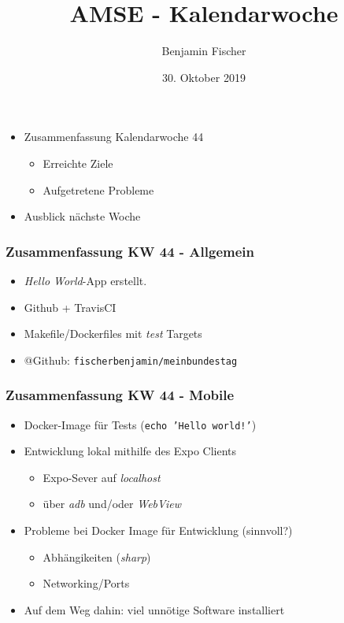 \documentclass{beamer}
\title{AMSE - Kalendarwoche \cw{}}
\date{30. Oktober 2019}
\author{Benjamin Fischer}
\institute{benjamin.f.fischer@fau.de}
\newcommand{\cw}{44}
\begin{document}
  \maketitle

  \begin{frame}
    \begin{itemize}
      \item Zusammenfassung Kalendarwoche \cw{}
      \begin{itemize}
        \item Erreichte Ziele
        \item Aufgetretene Probleme
      \end{itemize}
      \item Ausblick nächste Woche
    \end{itemize}
  \end{frame}

  \begin{frame}
    \frametitle{Zusammenfassung KW \cw{} - Allgemein}
    \begin{itemize}
      \item \textit{Hello World}-App erstellt.
      \item Github + TravisCI
      \item Makefile/Dockerfiles mit \textit{test} Targets
      \item @Github: \texttt{fischerbenjamin/meinbundestag}
    \end{itemize}
  \end{frame}
  
  \begin{frame}
    \frametitle{Zusammenfassung KW \cw{} - Mobile}
    \begin{itemize}
      \item Docker-Image für Tests (\texttt{echo 'Hello world!'})
      \item Entwicklung lokal mithilfe des Expo Clients
      \begin{itemize}
        \item Expo-Sever auf \textit{localhost}
        \item über \textit{adb} und/oder \textit{WebView}
      \end{itemize}
      \item Probleme bei Docker Image für Entwicklung (sinnvoll?)
      \begin{itemize}
        \item Abhängikeiten (\textit{sharp})
        \item Networking/Ports
      \end{itemize}
      \item Auf dem Weg dahin: viel unnötige Software installiert
    \end{itemize}
  \end{frame}
\end{document}
